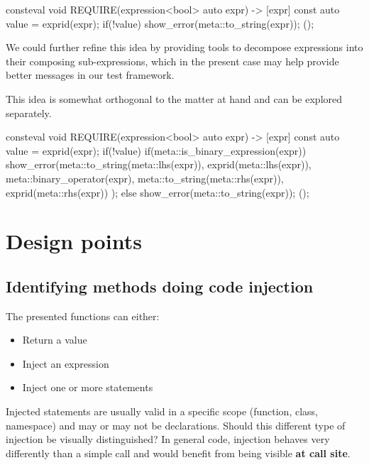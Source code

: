 \documentclass{wg21}
\begin{document}
\begin{colorblock}
consteval void REQUIRE(expression<bool> auto expr) {
    -> [expr] {
        const auto value = exprid(expr);
        if(!value) {
            show_error(meta::to_string(expr));
        }
    }(); 
}
\end{colorblock}

We could further refine this idea by providing tools to decompose expressions into
their composing sub-expressions, which in the present case may help provide better
messages in our test framework.

This idea is somewhat orthogonal to the matter at hand and can be explored separately.


\begin{colorblock}
consteval void REQUIRE(expression<bool> auto expr) {
    -> [expr] {
        const auto value = exprid(expr);
        if(!value) {
            if(meta::is_binary_expression(expr)) {
                show_error(meta::to_string(meta::lhs(expr)),
                           exprid(meta::lhs(expr)),
                           meta::binary_operator(expr),
                           meta::to_string(meta::rhs(expr)),
                           exprid(meta::rhs(expr))               
                );
            }
        }
        else {
            show_error(meta::to_string(expr));
        }
    }(); 
}
\end{colorblock}

\section{Design points}

\subsection{Identifying methods doing code injection}

The presented  functions can either: 
\begin{itemize}
    \item Return a value
    \item Inject an expression
    \item Inject one or more statements
\end{itemize}

Injected statements are usually valid in a specific scope (function, class, namespace) and may or may not be declarations.
Should this different type of injection be visually distinguished?
In general code, injection behaves very differently than a simple call and would benefit from being visible \textbf{at call site}.
\end{document}

